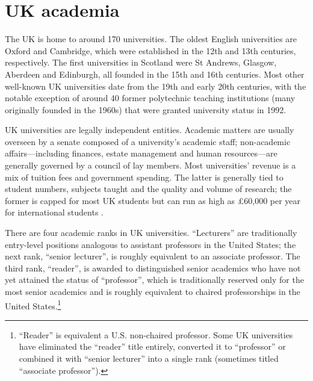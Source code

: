 \documentclass[a4paper, 1]{article}
\begin{document}
\hypertarget{sec:setting}{%
\section{UK academia}\label{sec:setting}}

The UK is home to around 170 universities. The oldest English universities are Oxford and Cambridge, which were established in the 12th and 13th centuries, respectively. The first universities in Scotland were St Andrews, Glasgow, Aberdeen and Edinburgh, all founded in the 15th and 16th centuries. Most other well-known UK universities date from the 19th and early 20th centuries, with the notable exception of around 40 former polytechnic teaching institutions (many originally founded in the 1960s) that were granted university status in 1992.

UK universities are legally independent entities. Academic matters are usually overseen by a senate composed of a university's academic staff; non-academic affairs---including finances, estate management and human resources---are generally governed by a council of lay members. Most universities' revenue is a mix of tuition fees and government spending. The latter is generally tied to student numbers, subjects taught and the quality and volume of research; the former is capped for most UK students but can run as high as £60,000 per year for international students \citep[see, \emph{e.g.},][]{Cambridge2022}.

There are four academic ranks in UK universities. ``Lecturers'' are traditionally entry-level positions analogous to assistant professors in the United States; the next rank, ``senior lecturer'', is roughly equivalent to an associate professor. The third rank, ``reader'', is awarded to distinguished senior academics who have not yet attained the status of ``professor'', which is traditionally reserved only for the most senior academics and is roughly equivalent to chaired professorships in the United States.\footnote{``Reader'' is equivalent a U.S. non-chaired professor. Some UK universities have eliminated the ``reader'' title entirely, converted it to ``professor'' or combined it with ``senior lecturer'' into a single rank (sometimes titled ``associate professor'').}
\end{document}
